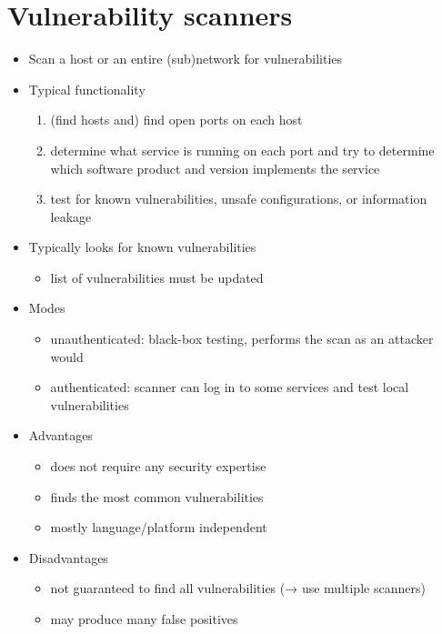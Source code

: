 \documentclass[final]{article}
\begin{document}
\section{Vulnerability scanners}
\begin{itemize}[nosep]
    \item Scan a host or an entire (sub)network for vulnerabilities
    \item Typical functionality
          \begin{enumerate}[nosep]
              \item (find hosts and) find open ports on each host
              \item determine what service is running on each port and try to determine which software product and version implements the service
              \item test for known vulnerabilities, unsafe configurations, or information leakage
          \end{enumerate}
    \item Typically looks for known vulnerabilities
          \begin{itemize}[nosep]
              \item list of vulnerabilities must be updated
          \end{itemize}
    \item Modes
          \begin{itemize}[nosep]
              \item unauthenticated: black-box testing, performs the scan as an attacker would
              \item authenticated: scanner can log in to some services and test local vulnerabilities
          \end{itemize}
    \item Advantages
          \begin{itemize}[nosep]
              \item does not require any security expertise
              \item finds the most common vulnerabilities
              \item mostly language/platform independent
          \end{itemize}
    \item Disadvantages
          \begin{itemize}[nosep]
              \item not guaranteed to find all vulnerabilities (→ use multiple scanners)
              \item may produce many false positives
          \end{itemize}
\end{itemize}
\end{document}
